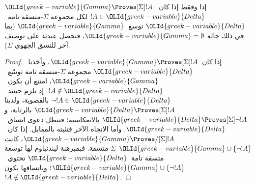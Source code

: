 \documentclass[../../../include/open-logic-section]{subfiles}
\begin{document}
\begin{cor}
  $\OLId{greek-variable}{Gamma} \Proves[\Sigma] !A$ إذا وفقط إذا كان~$!A \in \OLId{greek-variable}{Delta}$ لكل
  مجموعة $\Sigma$-متسقة تامة~$\OLId{greek-variable}{Delta}$ توسع~$\OLId{greek-variable}{Gamma}$ (بما في ذلك حالة
  $\OLId{greek-variable}{Gamma} = \emptyset$، فنحصل عندئذ على توصيف آخر للنسق الجهوي
  $\Sigma$).
\end{cor}

\begin{proof}
  إذا كان~$\OLId{greek-variable}{Gamma} \Proves[\Sigma] !A$، وأخذنا~$\OLId{greek-variable}{Delta}$ مجموعة
  $\Sigma$-متسقة تامة توسّع~$\OLId{greek-variable}{Gamma}$، امتنع أن يكون~$!A \notin \OLId{greek-variable}{Delta}$.
  إذ يلزم حينئذ~$\lnot!A \in \OLId{greek-variable}{Delta}$ بالقصوية، ولدينا
  $\OLId{greek-variable}{Delta} \Proves[\Sigma] !A$ بالرتابة، و
  $\OLId{greek-variable}{Delta} \Proves[\Sigma] \lnot!A$ بالانعكاسية؛ فتبطل دعوى اتساق~$\OLId{greek-variable}{Delta}$.
  وأما الاتجاه الآخر فنثبته بالمقابل. إذا كان~$\OLId{greek-variable}{Gamma} \Proves/[\Sigma] !A$،
  كانت $\OLId{greek-variable}{Gamma} \cup \{\lnot!A\}$ $\Sigma$-متسقة.
  فبمبرهنة ليندنباوم لها توسعة متسقة تامة~$\OLId{greek-variable}{Delta}$
  تحتوي~$\OLId{greek-variable}{Gamma} \cup \{\lnot!A\}$؛ وباتساقها يكون $!A \notin \OLId{greek-variable}{Delta}$.
\end{proof}
\end{document}
